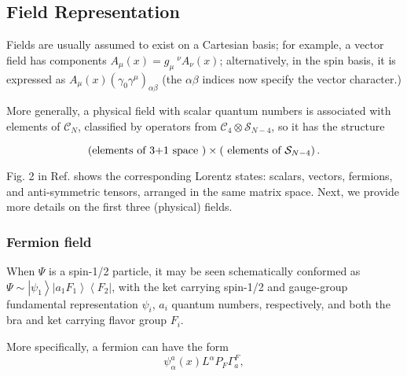 \documentclass[12pt]{article}
\renewcommand\[{\begin{dmath}}
\renewcommand\]{\end{dmath}}
\begin{document}
\subsection{Field Representation}

Fields are usually assumed to exist on a Cartesian basis;  for example, a vector field has components $A_\mu(x)=g_{\mu} \  ^\nu A_\nu(x)$; alternatively, in the
    spin  basis, it is expressed as
$A_\mu(x)(\gamma_0   \gamma^\mu ) _{\alpha \beta }$ (the  $\alpha \beta $ indices now specify the vector character.)


More generally, a physical field  with scalar quantum numbers is associated with elements of $\mathcal{C}_{N}$,
classified by operators from $\mathcal{C}_{4}\otimes\mathcal{S}_{N-4}$,
so it  has the structure

\begin{equation}
\left(\mbox{elements of 3+1 space }\right)\times\left(
\text{ elements of \ensuremath{\mathcal{S}_{N-4}}}
\right).\label{eq:10}
\end{equation}










Fig. 2 in Ref. \cite{Romero}  shows the corresponding  Lorentz states: scalars, vectors, fermions, and anti-symmetric tensors, arranged in the same matrix space.
 Next, we provide more details on the first
three (physical) fields.


\subsubsection*{Fermion field}

When  $\Psi$ is a spin-1/2 particle, it may be seen schematically    conformed as
 $\Psi\sim\left | \psi_1\right \rangle \left |a_1 F_1\right\rangle
 \left\langle F_2\right |$, with the ket  carrying spin-1/2    and gauge-group fundamental representation   $\psi_i$, $a_i$  quantum numbers, respectively, and both the bra and ket carrying  flavor group  $F_i$.






More specifically, a fermion can have the form
\begin{equation}
\psi_{\alpha}^{a}(x)L^{\alpha}P_{F}\Gamma_{a}^{F},\label{eq:16-1}
\end{equation}
\end{document}
